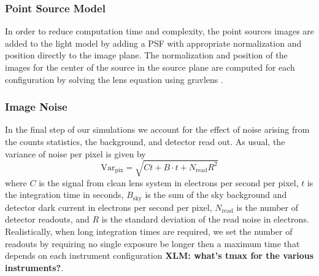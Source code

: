 \documentclass[a4paper,11pt]{article}
\begin{document}
\subsubsection{Point Source Model}

In order to reduce computation time and complexity, the point sources
images are added to the light model by adding a PSF with appropriate
normalization and position directly to the image plane. The
normalization and position of the images for the center of the source
in the source plane are computed for each configuration by solving the
lens equation using gravlens \cite{2011ascl.soft02003K}.


%


\subsubsection{Image Noise}

In the final step of our simulations we account for the effect of
noise arising from the counts statistics, the background, and detector
read out. As usual, the variance of noise per pixel is given by
%
\begin{equation}
   \label{eq:noise}
   \mathrm{Var}_{\mathrm{pix}} = \sqrt{Ct+B\cdot t + N_{\mathrm{read}} R^{2}}
\end{equation}
%
where $C$ is the signal from clean lens system in electrons per second
per pixel, $t$ is the integration time in seconds, $B_{\mathrm{sky}}$
is the sum of the sky background and detector dark current in
electrons per second per pixel, $N_{\mathrm{read}}$ is the number of
detector readouts, and $R$ is the standard deviation of the read noise
in electrons. Realistically, when long integration times are required,
we set the number of readouts by requiring no single exposure be
longer then a maximum time that depends on each instrument
configuration {\bf XLM: what's tmax for the various instruments?}.
\end{document}
